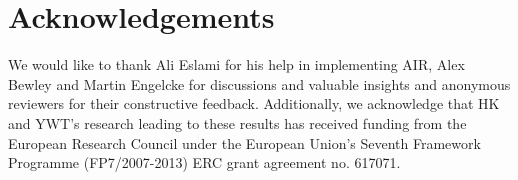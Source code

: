 \section*{Acknowledgements}

We would like to thank Ali Eslami for his help in implementing \gls{AIR}, Alex Bewley and Martin Engelcke for discussions and valuable insights and anonymous reviewers for their constructive feedback. Additionally, we acknowledge that HK and YWT's research leading to these results has received funding from the European Research Council under the European Union's Seventh Framework Programme (FP7/2007-2013) ERC grant agreement no. 617071.

